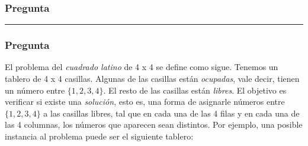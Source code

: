 \documentclass[12pt]{article}
\begin{document}


\subsubsection*{Pregunta }


\rule{\linewidth}{0.4pt}






\subsubsection*{Pregunta }

El problema del \textit{cuadrado latino} de 4 x 4 se define como sigue. Tenemos un 
tablero de 4 x 4 casillas. Algunas de las casillas están \textit{ocupadas}, vale decir, tienen un
número entre $\{1, 2, 3, 4\}$. El resto de las casillas están \textit{libres}. El objetivo es verificar
si existe una \textit{solución}, esto es, una forma de asignarle números entre $\{1, 2, 3, 4\}$ a las
casillas libres, tal que en cada una de las 4 filas y en cada una de las 4 columnas, los números 
que aparecen sean distintos. Por ejemplo, una posible instancia al problema puede ser el siguiente tablero:
\end{document}
